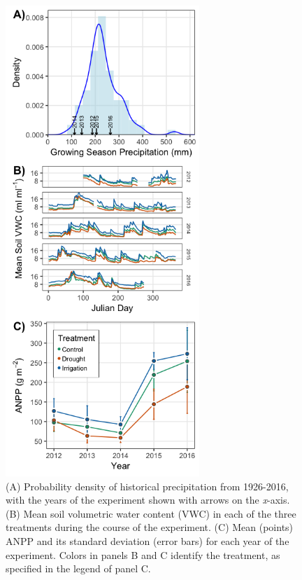 \documentclass[fleqn,10pt,lineno]{wlpeerj} %
\begin{document}
\begin{figure}[!ht]
  \centering
      \includegraphics[height=7in]{../figures/data_panels.png}
  \caption{(A) Probability density of historical precipitation from 1926-2016, with the years of the experiment shown with arrows on the \emph{x}-axis. (B) Mean soil volumetric water content (VWC) in each of the three treatments during the course of the experiment. (C) Mean (points) ANPP and its standard deviation (error bars) for each year of the experiment. Colors in panels B and C identify the treatment, as specified in the legend of panel C.}
\end{figure}

\newpage{}
\end{document}
